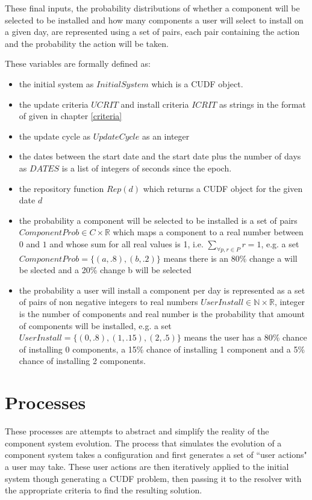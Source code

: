 These final inputs, the probability distributions of whether a component will be selected to be installed and how many components a user will select to install on a given day,
are represented using a set of pairs, each pair containing the action and the probability the action will be taken.

These variables are formally defined as:
\begin{itemize}
  \item the initial system as $InitialSystem$ which is a CUDF object.
  \item the update criteria $UCRIT$ and install criteria $ICRIT$ as strings in the format of given in chapter \ref{criteria}
  \item the update cycle as $UpdateCycle$ as an integer
  \item the dates between the start date and the start date plus the number of days as $DATES$ is a list of integers of seconds since the epoch.
  \item the repository function $Rep(d)$ which returns a CUDF object for the given date $d$
  \item the probability a component will be selected to be installed is a set of pairs $ComponentProb \in C \times \mathbb{R}$ which maps a component to a real number between $0$ and $1$ 
  and whose sum for all real values is 1, i.e. $\sum_{\forall p,r \in P}r = 1$,
  e.g. a set $ComponentProb = \{ (a,.8) , (b,.2)\}$ means there is an 80\% change a will be slected and a 20\% change b will be selected
  \item the probability a user will install a component per day is represented as a set of pairs of non negative integers to real numbers $UserInstall \in \mathbb{N} \times \mathbb{R}$,
  integer is the number of components and real number is the probability that amount of components will be installed, 
  e.g.  a set $UserInstall = \{ (0,.8) , (1,.15), (2,.5)\}$ means the user has a 80\% chance of installing 0 components, a 15\% chance of installing 1 component and a
  5\% chance of installing 2 components.
\end{itemize} 


\section{Processes}
These processes are attempts to abstract and simplify the reality of the component system evolution.
The process that simulates the evolution of a component system takes a configuration and first generates a set of ``user actions" a user may take.
These user actions are then iteratively applied to the initial system though generating a CUDF problem,
then passing it to the resolver with the appropriate criteria to find the resulting solution.

